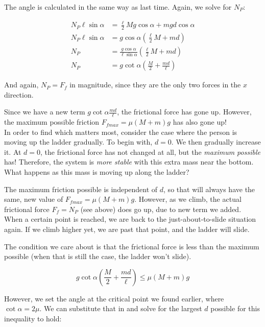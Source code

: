 The angle is calculated in the same way as last time. Again, we solve for $N_P$:

\begin{align}
N_P \ell \sin \alpha &= \frac{\ell}{2} M g \cos \alpha + m g d \cos \alpha\\
N_P \ell \sin \alpha &= g \cos \alpha \left(\frac{\ell}{2} M + m d\right)\\
N_P &= \frac{g \cos \alpha}{\ell \sin \alpha} \left(\frac{\ell}{2} M + m d\right)\\
N_P &= g \cot \alpha \left(\frac{M}{2} + \frac{m d}{\ell}\right)
\end{align}

And again, $N_P = F_f$ in magnitude, since they are the only two forces in the $x$ direction.

Since we have a new term $\displaystyle g \cot \alpha \frac{m d}{\ell}$, the frictional force has gone up. However, the maximum possible friction $F_{fmax} = \mu (M + m) g$ has also gone up!\\
In order to find which matters most, consider the case where the person is moving up the ladder gradually. To begin with, $d = 0$. We then gradually increase it. At $d = 0$, the frictional force has not changed at all, but the \emph{maximum possible} has! Therefore, the system is \emph{more stable} with this extra mass near the bottom. What happens as this mass is moving up along the ladder?

The maximum friction possible is independent of $d$, so that will always have the same, new value of $F_{fmax} = \mu (M + m) g$. However, as we climb, the actual frictional force $F_f = N_P$ (see above) does go up, due to new term we added.\\
When a certain point is reached, we are back to the just-about-to-slide situation again. If we climb higher yet, we are past that point, and the ladder will slide.

The condition we care about is that the frictional force is less than the maximum possible (when that is still the case, the ladder won't slide).

\begin{equation}
g \cot \alpha \left(\frac{M}{2} + \frac{m d}{\ell}\right) \le \mu (M + m) g
\end{equation}

However, we set the angle at the critical point we found earlier, where $\cot \alpha = 2 \mu$. We can substitute that in and solve for the largest $d$ possible for this inequality to hold:

